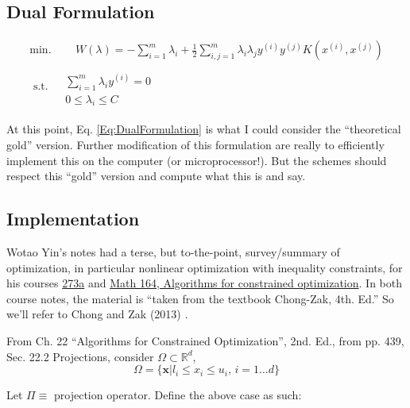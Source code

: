 \documentclass[10pt]{amsart}
\begin{document}
\begin{multicols*}{2}
\section{Dual Formulation}

\begin{equation}\label{Eq:DualFormulation}
\begin{gathered}
  \text{min}. \qquad \, W(\lambda) = -\sum_{i=1}^m \lambda_i +\frac{1}{2} \sum_{i,j=1}^m \lambda_i \lambda_j y^{(i)} y^{(j)} K(x^{(i)},x^{(j)}) \\
  \text{ s.t. } \begin{aligned} & \quad \\
    & \sum_{i=1}^m \lambda_i y^{(i)} = 0  \\
    & 0 \leq \lambda_i \leq C \end{aligned}
  \end{gathered}
  \end{equation}

At this point, Eq. \ref{Eq:DualFormulation} is what I could consider the ``theoretical gold'' version.  Further modification of this formulation are really to efficiently implement this on the computer (or microprocessor!).  But the schemes should respect this ``gold'' version and compute what this is and say.  

\subsection{Implementation}

Wotao Yin's notes had a terse, but to-the-point, survey/summary of optimization, in particular nonlinear optimization with inequality constraints, for his courses \href{http://www.math.ucla.edu/~wotaoyin/math273a/slides/Lec6_NLP_w_inequality_constraints_273a_2015_f.pdf}{273a} and \href{http://www.math.ucla.edu/~wotaoyin/math164/slides/wotao_yin_optimization_lec13_algorithms_for_constrained_optimization.pdf}{Math 164, Algorithms for constrained optimization}.  In both course notes, the material is ``taken from the textbook Chong-Zak, 4th. Ed.''  So we'll refer to Chong and Zak (2013) \cite{ChZa2013}.   

From Ch. 22 ``Algorithms for Constrained Optimization'', 2nd. Ed., from pp. 439, Sec. 22.2 Projections, consider $\Omega \subset \mathbb{R}^d$, \[
\Omega = \lbrace \mathbf{x} | l_i \leq x_i \leq u_i , \, i = 1\dots d\rbrace
\]

Let $\Pi \equiv $ projection operator.  Define the above case as such:


\end{multicols*}
\end{document}
